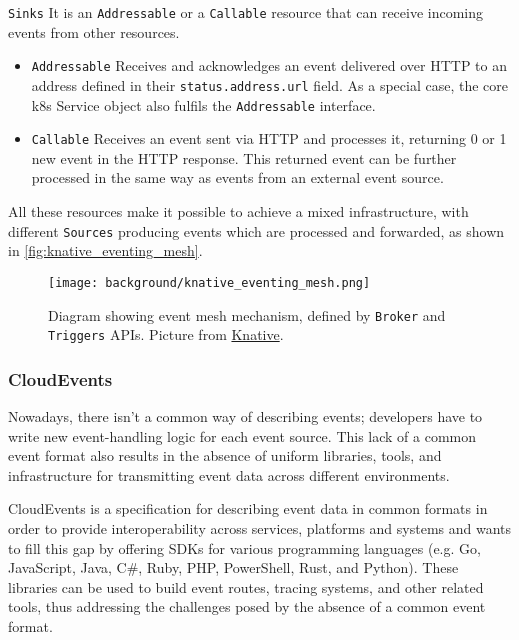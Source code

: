 \documentclass[../thesis.tex]{subfiles}
\begin{document}
\texttt{Sinks} It is an \texttt{Addressable} or a \texttt{Callable} resource that can receive incoming events from other resources.

\begin{itemize}
    \item \texttt{Addressable} Receives and acknowledges an event delivered over \acrshort{HTTP} to an address defined in their \texttt{status.address.url} field. As a special case, the core \gls{k8s} Service object also fulfils the \texttt{Addressable} interface.
    \item \texttt{Callable} Receives an event sent via \acrshort{HTTP} and processes it, returning 0 or 1 new event in the \acrshort{HTTP} response. This returned event can be further processed in the same way as events from an external event source.
\end{itemize}

All these resources make it possible to achieve a mixed infrastructure, with different \texttt{Sources} producing events which are processed and forwarded, as shown in \autoref{fig:knative_eventing_mesh}.

\begin{figure}[H]
    \centering
    \texttt{[image: background/knative\_eventing\_mesh.png]}
    \caption[Event mesh diagram]{Diagram showing event mesh mechanism, defined by \texttt{Broker} and \texttt{Triggers} \acrshort{API}s. Picture from \href{https://knative.dev/docs/eventing/event-mesh/}{Knative}.}
    \label{fig:knative_eventing_mesh}
\end{figure}

\subsubsection{CloudEvents}
Nowadays, there isn't a common way of describing events; developers have to write new event-handling logic for each event source. This lack of a common event format also results in the absence of uniform libraries, tools, and infrastructure for transmitting event data across different environments.

CloudEvents \cite{site:cloudevents} is a specification for describing event data in common formats in order to provide interoperability across services, platforms and systems and wants to fill this gap by offering \acrshort{SDK}s for various programming languages (e.g. Go, JavaScript, Java, C\#, Ruby, PHP, PowerShell, Rust, and Python). These libraries can be used to build event routes, tracing systems, and other related tools, thus addressing the challenges posed by the absence of a common event format.
\end{document}
